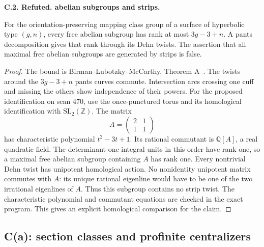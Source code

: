 \documentclass[11pt,oneside]{article}
\makeatletter
\newcounter{statementanchor}
\newenvironment{statement}[3]{%
 \refstepcounter{statementanchor}\def\@currentlabel{#1}%
 \par\addvspace{9pt}\noindent
 \textbf{#1. #2. #3.}\par\nobreak\noindent\ignorespaces
}{\par\addvspace{5pt}}
\makeatother
\begin{document}
\begin{statement}{C.2}{Refuted}{abelian subgroups and strips}
\label{st:C.2}
\label{C-abelian}
For the orientation-preserving mapping class group of a
surface of hyperbolic type $(g,n)$, every free abelian
subgroup has rank at most $3g-3+n$. A pants decomposition
gives that rank through its Dehn twists.
The assertion that all maximal free abelian subgroups
are generated by strips is false.
\end{statement}
\begin{proof}
The bound is Birman--Lubotzky--McCarthy, Theorem A~\cite{BLM1983}.
The twists around the $3g-3+n$ pants curves commute.
Intersection arcs crossing one cuff and missing the others
show independence of their powers.
For the proposed identification on scan 470, use the
once-punctured torus and its homological identification
with $\mathrm{SL}_2(\mathbb Z)$. The matrix
\[
 A=\begin{pmatrix}2&1\\1&1\end{pmatrix}
\]
has characteristic polynomial $t^2-3t+1$. Its rational
commutant is $\mathbb Q[A]$, a real quadratic field.
The determinant-one integral units in this order have
rank one, so a maximal free abelian subgroup containing
$A$ has rank one. Every nontrivial Dehn twist has
unipotent homological action. No nonidentity unipotent
matrix commutes with $A$: its unique rational eigenline
would have to be one of the two irrational eigenlines
of $A$. Thus this subgroup contains no strip twist.
The characteristic polynomial and commutant equations
are checked in the exact program. This gives an
explicit homological comparison for the claim.
\end{proof}

\subsection{C(a): section classes and profinite centralizers}
\end{document}
